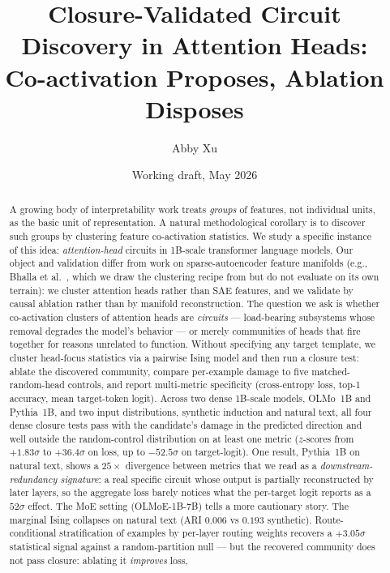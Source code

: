 \documentclass[11pt]{article}
\title{Closure-Validated Circuit Discovery in Attention Heads:\\
Co-activation Proposes, Ablation Disposes}
\author{Abby Xu}
\date{Working draft, May 2026}
\begin{document}
\maketitle

\begin{abstract}
A growing body of interpretability work treats \emph{groups} of features, not
individual units, as the basic unit of representation. A natural methodological
corollary is to discover such groups by clustering feature co-activation
statistics. We study a specific instance of this idea: \emph{attention-head}
circuits in 1B-scale transformer language models. Our object and validation
differ from work on sparse-autoencoder feature manifolds (e.g.,
Bhalla et al.~\cite{bhalla2026}, which we draw the clustering recipe from but
do not evaluate on its own terrain): we cluster attention heads rather than
SAE features, and we validate by causal ablation rather than by manifold
reconstruction. The question we ask is whether co-activation clusters of
attention heads are \emph{circuits} --- load-bearing subsystems whose removal
degrades the model's behavior --- or merely communities of heads that fire
together for reasons unrelated to function. Without specifying any target template, we cluster head-focus
statistics via a pairwise Ising model and then run a closure test: ablate the
discovered community, compare per-example damage to five matched-random-head
controls, and report multi-metric specificity (cross-entropy loss, top-1
accuracy, mean target-token logit). Across two dense 1B-scale models, OLMo~1B
and Pythia~1B, and two input distributions, synthetic induction and natural
text, all four dense closure tests pass with the candidate's damage in the
predicted direction and well outside the random-control distribution on at
least one metric ($z$-scores from $+1.83\sigma$ to $+36.4\sigma$ on loss, up to
$-52.5\sigma$ on target-logit). One result, Pythia~1B on natural text, shows a
$25\times$ divergence between metrics that we read as a
\emph{downstream-redundancy signature}: a real specific circuit whose output
is partially reconstructed by later layers, so the aggregate loss barely
notices what the per-target logit reports as a $52\sigma$ effect. The MoE
setting (OLMoE-1B-7B) tells a more cautionary story. The marginal Ising
collapses on natural text (ARI $0.006$ vs $0.193$ synthetic). Route-conditional
stratification of examples by per-layer routing weights recovers a
$+3.05\sigma$ statistical signal against a random-partition null --- but the
recovered community does not pass closure: ablating it \emph{improves} loss,

\end{abstract}
\end{document}
